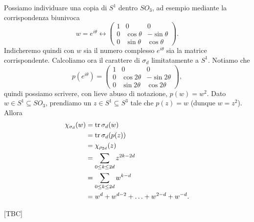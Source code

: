 Possiamo individuare una copia di $S^1$ dentro $SO_3$, ad esempio mediante la corrispondenza biunivoca
$$
w=e^{i\theta}\longleftrightarrow\begin{pmatrix}1&0&0\\0&\cos\theta&-\sin\theta\\0&\sin\theta&\cos\theta\end{pmatrix}.
$$
Indicheremo quindi con $w$ sia il numero complesso $e^{i\theta}$ sia la matrice corrispondente. Calcoliamo ora il carattere di $\sigma_d$ limitatamente a $S^1$.  Notiamo che
$$
p(e^{i\theta})=\begin{pmatrix}1&0&0\\0&\cos2\theta&-\sin2\theta\\0&\sin2\theta&\cos2\theta\end{pmatrix},
$$
quindi possiamo scrivere, con lieve abuso di notazione, $p(w)=w^2$. Dato $w\in S^1\subseteq SO_3$, prendiamo un $z\in S^1\subseteq S^3$ tale che $p(z)=w$ (dunque $w=z^2$). Allora
\begin{align*}
\chi_{\sigma_d}(w)&=\operatorname{tr}\sigma_d(w)\\
&=\operatorname{tr}\sigma_d(p(z))\\
&=\chi_{\rho_{2d}}(z)\\
&=\sum_{0\le k\le 2d}z^{2k-2d}\\
&=\sum_{0\le k\le 2d}w^{k-d}\\
&=w^d+w^{d-2}+\ldots+w^{2-d}+w^{-d}.
\end{align*}

[TBC]

